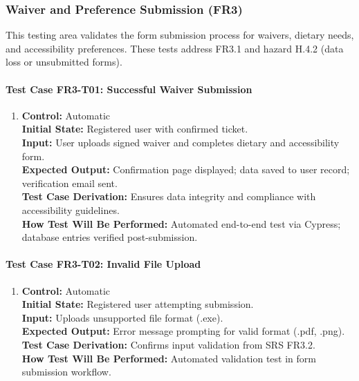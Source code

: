 \documentclass[12pt, titlepage]{article}
\begin{document}
\subsubsection{Waiver and Preference Submission (FR3)}

This testing area validates the form submission process for waivers, dietary needs, and accessibility preferences. These tests address FR3.1 and hazard H.4.2 (data loss or unsubmitted forms).

\paragraph{Test Case FR3-T01: Successful Waiver Submission}

\begin{enumerate}
    \item \textbf{Control:} Automatic\\
    \textbf{Initial State:} Registered user with confirmed ticket.\\
    \textbf{Input:} User uploads signed waiver and completes dietary and accessibility form.\\
    \textbf{Expected Output:} Confirmation page displayed; data saved to user record; verification email sent.\\
    \textbf{Test Case Derivation:} Ensures data integrity and compliance with accessibility guidelines.\\
    \textbf{How Test Will Be Performed:} Automated end-to-end test via Cypress; database entries verified post-submission.
\end{enumerate}

\paragraph{Test Case FR3-T02: Invalid File Upload}

\begin{enumerate}
    \item \textbf{Control:} Automatic\\
    \textbf{Initial State:} Registered user attempting submission.\\
    \textbf{Input:} Uploads unsupported file format (.exe).\\
    \textbf{Expected Output:} Error message prompting for valid format (.pdf, .png).\\
    \textbf{Test Case Derivation:} Confirms input validation from SRS FR3.2.\\
    \textbf{How Test Will Be Performed:} Automated validation test in form submission workflow.
\end{enumerate}
\end{document}
